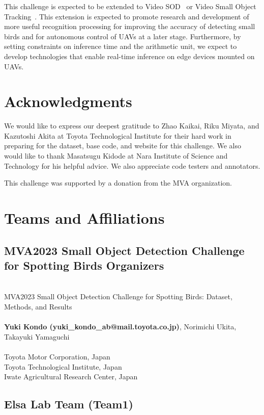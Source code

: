 \documentclass{mva_style}
\begin{document}
This challenge is expected to be extended to Video SOD~\cite{rekavandi2022guide,bosquet2021correlation} or Video Small Object Tracking~\cite{zhu2023tiny,zhang2022tracking}. This extension is expected to promote research and development of more useful recognition processing for improving the accuracy of detecting small birds and for autonomous control of UAVs at a later stage. Furthermore, by setting constraints on inference time and the arithmetic unit, we expect to develop technologies that enable real-time inference on edge devices mounted on UAVs.

\section{Acknowledgments}
We would like to express our deepest gratitude to Zhao Kaikai, Riku
Miyata, and Kazutoshi Akita at Toyota Technological Institute for
their hard work in preparing for the dataset, base code, and website
for this challenge. We also would like to thank Masatsugu Kidode at
Nara Institute of Science and Technology for his helpful advice. We
also appreciate code testers and annotators.

This challenge was supported by a donation from the MVA organization.


\appendix
\section{Teams and Affiliations}
\label{sec:apd:team}

\subsection*{MVA2023 Small Object Detection Challenge for Spotting Birds Organizers}
\\ MVA2023 Small Object Detection Challenge for Spotting Birds: Dataset, Methods, and Results\\
\\ \textbf{Yuki Kondo (yuki\_kondo\_ab@mail.toyota.co.jp)}, Norimichi Ukita, Takayuki Yamaguchi\\
\\
 Toyota Motor Corporation, Japan\\
 Toyota Technological Institute, Japan\\
 Iwate Agricultural Research Center, Japan\\

\subsection*{Elsa Lab Team (Team1)}
\end{document}
